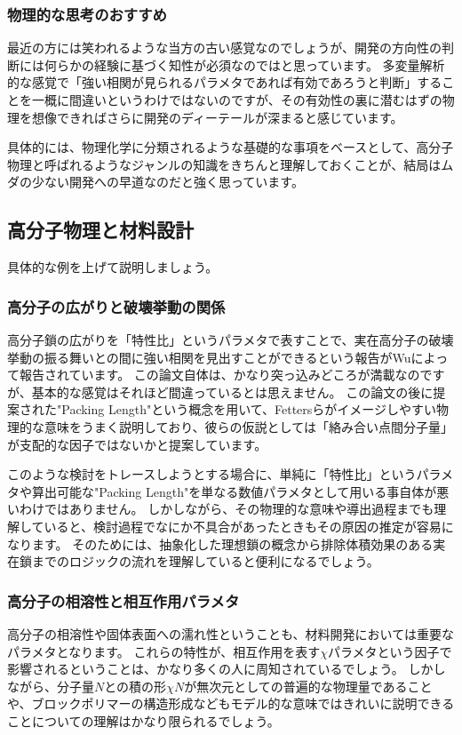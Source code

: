 \documentclass[a4paper,11pt]{jlreq}
\begin{document}
\subsubsection{物理的な思考のおすすめ}
最近の方には笑われるような当方の古い感覚なのでしょうが、開発の方向性の判断には何らかの経験に基づく知性が必須なのではと思っています。
多変量解析的な感覚で「強い相関が見られるパラメタであれば有効であろうと判断」することを一概に間違いというわけではないのですが、その有効性の裏に潜むはずの物理を想像できればさらに開発のディーテールが深まると感じています。

具体的には、物理化学に分類されるような基礎的な事項をベースとして、高分子物理と呼ばれるようなジャンルの知識をきちんと理解しておくことが、結局はムダの少ない開発への早道なのだと強く思っています。

\subsection{高分子物理と材料設計}
具体的な例を上げて説明しましょう。

\subsubsection{高分子の広がりと破壊挙動の関係}
高分子鎖の広がりを「特性比」というパラメタで表すことで、実在高分子の破壊挙動の振る舞いとの間に強い相関を見出すことができるという報告がWuによって報告されています。
この論文自体は、かなり突っ込みどころが満載なのですが、基本的な感覚はそれほど間違っているとは思えません。
この論文の後に提案された"Packing Length"という概念を用いて、Fettersらがイメージしやすい物理的な意味をうまく説明しており、彼らの仮説としては「絡み合い点間分子量」が支配的な因子ではないかと提案しています。

このような検討をトレースしようとする場合に、単純に「特性比」というパラメタや算出可能な"Packing Length"を単なる数値パラメタとして用いる事自体が悪いわけではありません。
しかしながら、その物理的な意味や導出過程までも理解していると、検討過程でなにか不具合があったときもその原因の推定が容易になります。
そのためには、抽象化した理想鎖の概念から排除体積効果のある実在鎖までのロジックの流れを理解していると便利になるでしょう。

\subsubsection{高分子の相溶性と相互作用パラメタ}
高分子の相溶性や固体表面への濡れ性ということも、材料開発においては重要なパラメタとなります。
これらの特性が、相互作用を表す$\chi$パラメタという因子で影響されるということは、かなり多くの人に周知されているでしょう。
しかしながら、分子量$N$との積の形$\chi N$が無次元としての普遍的な物理量であることや、ブロックポリマーの構造形成などもモデル的な意味ではきれいに説明できることについての理解はかなり限られるでしょう。
\end{document}
